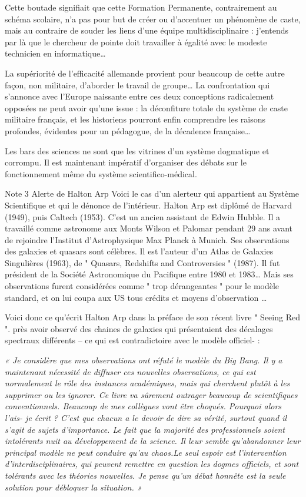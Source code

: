 \documentclass[a4paper,12pt]{article}
\begin{document}
Cette boutade signifiait que cette Formation Permanente, contrairement au schéma scolaire, n’a pas pour but de créer ou d’accentuer un phénomène de caste, mais au contraire de souder les liens d’une équipe multidisciplinaire : j’entends par là que le chercheur de pointe doit travailler à égalité avec le modeste technicien en informatique… 


La supériorité de l’efficacité allemande provient pour beaucoup de cette autre façon, non militaire, d’aborder le travail de groupe… La confrontation qui s’annonce avec l’Europe naissante entre ces deux conceptions radicalement opposées ne peut avoir qu’une issue : la déconfiture totale du système de caste militaire français, et les historiens pourront enfin comprendre les raisons profondes, évidentes pour un pédagogue, de la décadence française…


 Les bars des sciences ne sont que les vitrines d’un système dogmatique et corrompu.  
Il est maintenant impératif d’organiser des débats sur le fonctionnement même du système scientifico-médical.


Note 3 Alerte de Halton Arp
Voici le cas d’un alerteur qui appartient au Système Scientifique et qui le dénonce de l’intérieur. Halton Arp est diplômé de Harvard (1949), puis Caltech (1953). C’est un ancien assistant de Edwin Hubble. Il a travaillé comme astronome aux Monts Wilson et Palomar pendant 29 ans avant de rejoindre l’Institut d’Astrophysique Max Planck à Munich. Ses observations des galaxies et quasars sont célèbres. Il est l’auteur d’un Atlas de Galaxies Singulières (1963), de " Quasars, Redshifts and Controversies " (1987). Il fut président de la Société Astronomique du Pacifique entre 1980 et 1983… Mais ses observations furent considérées comme " trop dérangeantes " pour le modèle standard, et on lui coupa aux US tous crédits et moyens d’observation … 


Voici donc ce qu’écrit Halton Arp dans la préface de son récent livre " Seeing Red ". près avoir observé des chaines de galaxies qui présentaient des décalages spectraux différents – ce qui est contradictoire avec le modèle officiel- :


\textit{« Je considère que mes observations ont réfuté le modèle du Big Bang. Il y a maintenant nécessité de diffuser ces nouvelles observations, ce qui est normalement le rôle des instances académiques, mais qui cherchent plutôt à les supprimer ou les ignorer. Ce livre va sûrement outrager beaucoup de scientifiques conventionnels. Beaucoup de mes collègues vont être choqués. Pourquoi alors l’ais- je écrit ? C’est que chacun a le devoir de dire sa vérité, surtout quand il s’agit de sujets d’importance. Le fait que la majorité des professionnels soient intolérants nuit au développement de la science. Il leur semble qu’abandonner leur principal modèle ne peut conduire qu’au chaos.Le seul espoir est l’intervention d’interdisciplinaires, qui peuvent remettre en question les dogmes officiels, et sont tolérants avec les théories nouvelles. Je pense qu’un débat honnête est la seule solution pour débloquer la situation. »}
\end{document}
